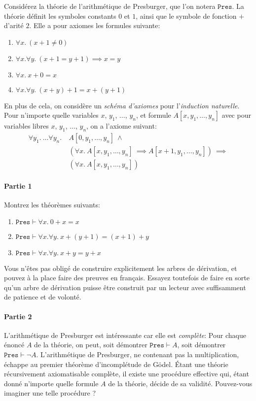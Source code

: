 \documentclass[12pt,french,a4paper]{article}
\begin{document}
\begin{question}
Considérez la théorie de l'arithmétique de Presburger, que l'on notera $\texttt{Pres}$.
La théorie définit les symboles constants $0$ et $1$, ainsi que le symbole de fonction $+$ d'arité $2$.
Elle a pour axiomes les formules suivante:
\begin{enumerate}
\item $\forall x.\ (x + 1 \neq 0)$
\item $\forall x. \forall y.\ (x + 1 = y + 1) \implies x = y$
\item $\forall x.\ x + 0 = x$
\item $\forall x. \forall y.\ (x + y) + 1 = x + (y + 1)$
\end{enumerate}
En plus de cela, on considère un \textit{schéma d'axiomes} pour l'\textit{induction naturelle}.
Pour n'importe quelle variables $x$, $y_1$, $\dots$, $y_n$, et formule $A[x, y_1, \dots, y_n]$ avec pour variables libres $x$, $y_1$, $\dots$, $y_n$, on a l'axiome suivant:
\begin{align*}
\forall y_1.\ \dots \forall y_n.\ &A[0, y_1, \dots, y_n]\ \wedge\\
&(\forall x.\ A[x, y_1, \dots, y_n]\ \implies A[x + 1, y_1, \dots, y_n])\ \implies\\
&(\forall x.\ A[x, y_1, \dots, y_n])
\end{align*}

\paragraph{Partie 1}

Montrez les théorèmes suivants:
\begin{enumerate}
\item $\texttt{Pres} \vdash \forall x.\ 0 + x = x$
\item $\texttt{Pres} \vdash \forall x. \forall y.\ x + (y + 1) = (x + 1) + y$
\item $\texttt{Pres} \vdash \forall x. \forall y.\ x + y = y + x$
\end{enumerate}
Vous n'êtes pas obligé de construire explicitement les arbres de dérivation, et pouvez à la place faire des preuves en français.
Essayez toutefois de faire en sorte qu'un arbre de dérivation puisse être construit par un lecteur avec suffisamment de patience et de volonté.

\paragraph{Partie 2}

L'arithmétique de Presburger est intéressante car elle est \textit{complète}: Pour chaque énoncé $A$ de la théorie, on peut, soit démontrer $\texttt{Pres} \vdash A$, soit démontrer $\texttt{Pres} \vdash \neg A$.
L'arithmétique de Presburger, ne contenant pas la multiplication, échappe au premier théorème d'incomplétude de Gödel.
Étant une théorie récursivement axiomatisable complète, il existe une procédure effective qui, étant donné n'importe quelle formule $A$ de la théorie, décide de sa validité. Pouvez-vous imaginer une telle procédure ?
\end{question}
\end{document}
